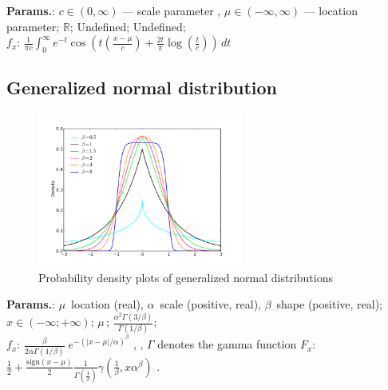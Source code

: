     {\color{darkblue} \textbf{Params.}:} {$c \in(0,\infty)$ — scale parameter ,  $\mu\in(-\infty,\infty)$ — location parameter}; {$\mathbb{R}$}; {Undefined}; {Undefined};\hspace{0.5cm}\\{\color{darkblue} \textbf{$f_x$}:} {$ \frac{1}{\pi c}\int_0^\infty e^{-t}\cos\left(t\left(\frac{x-\mu}{c}\right) + \frac{2t}{\pi}\log\left(\frac{t}{c}\right)\right)\, dt$}



    
        
\subsection{Generalized normal distribution}


    \begin{figure}[H]
        \centering
        \includegraphics[width=0.6\textwidth]{images/Generalized normal densities.png}
        \caption{Probability density plots of generalized normal distributions}
    \end{figure}




    {\color{darkblue} \textbf{Params.}:} {$ \mu \,$ location (real),  $ \alpha \,$ scale (positive, real),  $ \beta \,$ shape (positive, real)}; {$x \in (-\infty; +\infty)\!$}; {$ \mu \,$}; {$\frac{\alpha^2\Gamma(3/\beta)}{\Gamma(1/\beta)}$};\hspace{0.5cm}\\{\color{darkblue} \textbf{$f_x$}:} {$\frac{\beta}{2\alpha\Gamma(1/\beta)} \; e^{-(|x-\mu|/\alpha)^\beta}$ , ,  $\Gamma$ denotes the gamma function}{\color{darkblue} \textbf{$F_x$}:} {$\frac{1}{2}+ \frac{\text{sign}(x - \mu)}{2} \frac{1}{\Gamma \left(\frac{1}{\beta}\right)} \gamma\left(\frac{1}{\beta}, x \alpha^\beta\right)$ .}



